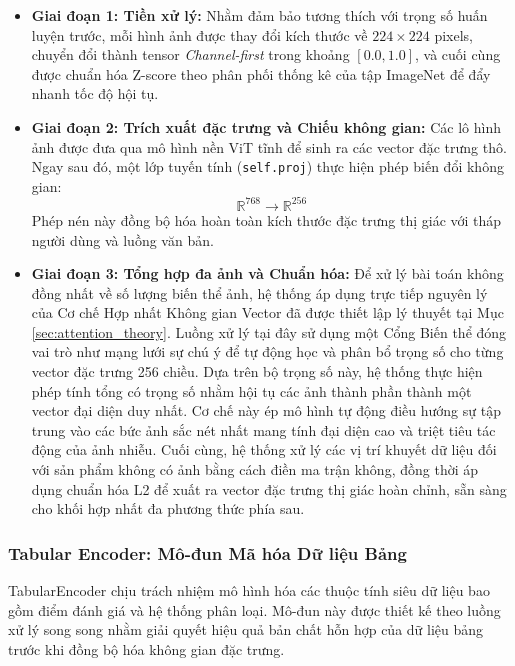 \begin{itemize}
    \item \textbf{Giai đoạn 1: Tiền xử lý:} Nhằm đảm bảo tương thích với trọng số huấn luyện trước, mỗi hình ảnh được thay đổi kích thước về $224 \times 224$ pixels, chuyển đổi thành tensor \textit{Channel-first} trong khoảng $[0.0, 1.0]$, và cuối cùng được chuẩn hóa Z-score theo phân phối thống kê của tập ImageNet để đẩy nhanh tốc độ hội tụ.
    
    \item \textbf{Giai đoạn 2: Trích xuất đặc trưng và Chiếu không gian:} Các lô hình ảnh được đưa qua mô hình nền ViT tĩnh để sinh ra các vector đặc trưng thô. Ngay sau đó, một lớp tuyến tính (\texttt{self.proj}) thực hiện phép biến đổi không gian:
    \begin{equation}
        \mathbb{R}^{768} \rightarrow \mathbb{R}^{256}
    \end{equation}
    Phép nén này đồng bộ hóa hoàn toàn kích thước đặc trưng thị giác với tháp người dùng và luồng văn bản.
    
    \item \textbf{Giai đoạn 3: Tổng hợp đa ảnh và Chuẩn hóa:} Để xử lý bài toán không đồng nhất về số lượng biến thể ảnh, hệ thống áp dụng trực tiếp nguyên lý của Cơ chế Hợp nhất Không gian Vector đã được thiết lập lý thuyết tại Mục \ref{sec:attention_theory}. Luồng xử lý tại đây sử dụng một Cổng Biến thể đóng vai trò như mạng lưới sự chú ý để tự động học và phân bổ trọng số cho từng vector đặc trưng 256 chiều. Dựa trên bộ trọng số này, hệ thống thực hiện phép tính tổng có trọng số nhằm hội tụ các ảnh thành phần thành một vector đại diện duy nhất. Cơ chế này ép mô hình tự động điều hướng sự tập trung vào các bức ảnh sắc nét nhất mang tính đại diện cao và triệt tiêu tác động của ảnh nhiễu. Cuối cùng, hệ thống xử lý các vị trí khuyết dữ liệu đối với sản phẩm không có ảnh bằng cách điền ma trận không, đồng thời áp dụng chuẩn hóa L2 để xuất ra vector đặc trưng thị giác hoàn chỉnh, sẵn sàng cho khối hợp nhất đa phương thức phía sau.
    
\end{itemize}

\subsubsection{Tabular Encoder: Mô-đun Mã hóa Dữ liệu Bảng}

TabularEncoder chịu trách nhiệm mô hình hóa các thuộc tính siêu dữ liệu bao gồm điểm đánh giá và hệ thống phân loại. Mô-đun này được thiết kế theo luồng xử lý song song nhằm giải quyết hiệu quả bản chất hỗn hợp của dữ liệu bảng trước khi đồng bộ hóa không gian đặc trưng.


